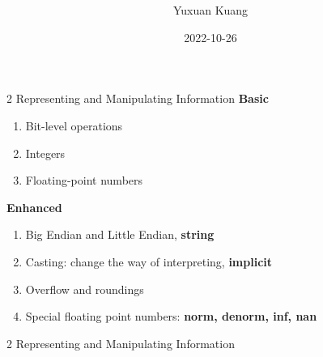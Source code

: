 \documentclass{beamer}
\title{\textbf{\topic}}
\author{Yuxuan Kuang}
\institute{School of EECS, PKU}
\date{2022-10-26}
\begin{document}
{ 
\frame{\titlepage}}

\begin{frame}{2 Representing and Manipulating Information}
\textbf{Basic}
\begin{enumerate}
	\item Bit-level operations
	\item Integers
	\item Floating-point numbers
\end{enumerate}
\textbf{Enhanced}
\begin{enumerate}
	\item Big Endian and Little Endian, \textbf{string} %
	\item Casting: change the way of interpreting, \textbf{implicit}
	\item Overflow and roundings
	\item Special floating point numbers: \textbf{norm, denorm, inf, nan}
\end{enumerate}
\end{frame}

\begin{frame}{2 Representing and Manipulating Information}
	\only<1> {
	}
	 {
	}
\end{frame}
\end{document}
